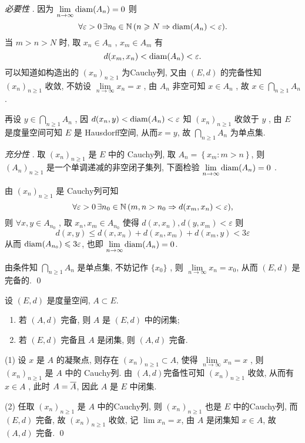     \begin{Proof}
       \textsl{必要性} . 因为 $ \lim\limits_{n\to\infty}\diam(A_{n})=0 $ 则
       \[
          \forall \varepsilon>0\,\exists n_{0}\in\N\,(n\geqslant N\Rightarrow \diam(A_{n})<\varepsilon).
       \]
       当 $ m>n>N $ 时, 取 $ x_{n}\in A_{n} $ , $ x_{m}\in A_{m} $ 有
       \[
          d(x_{m}, x_{n})<\diam(A_{n})<\varepsilon.
       \]
       可以知道如构造出的 $ (x_{n})_{n\geqslant1} $ 为Cauchy列, 又由 $ (E, d) $ 的完备性知 $ (x_{n})_{n\geqslant1} $ 收敛, 不妨设 $\lim\limits_{n\to\infty}x_{n}=x$ , 由 $ A_{n} $ 非空可知 $ x\in A_{n} $ , 故 $ x\in\bigcap\limits_{n\geqslant1}A_{n} $ .

       再设 $ y\in\bigcap\limits_{n\geqslant1} A_{n} $ , 因 $ d(x_{n}, y)<\diam(A_{n})<\varepsilon $ 知 $ (x_{n})_{n\geqslant1} $ 收敛于 $ y $ , 由 $ E $ 是度量空间可知 $ E $ 是 Hausdorff空间, 从而$ x=y $, 故 $ \bigcap\limits_{n\geqslant1} A_{n} $ 为单点集.

       \textsl{充分性} . 取 $ (x_{n})_{n\geqslant1} $ 是 $ E $ 中的 Cauchy列, 取 $ A_{n}=\left\{ x_{m}:m>n \right\} $, 则 $ (A_{n})_{n\geqslant1} $ 是一个单调递减的非空闭子集列, 下面检验 $ \lim\limits_{n\to\infty}\diam(A_{n})=0 $ .

       由 $ (x_{n})_{n\geqslant1} $ 是 Cauchy列可知
       \[
          \forall \varepsilon>0\, \exists n_{0}\in\N\,(m, n>n_{0}\Rightarrow d(x_{m}, x_{n})<\varepsilon),
       \]
       则 $ \forall x, y\in A_{n_{0}} $ , 取 $ x_{n}, x_{m}\in A_{n_{0}} $ 使得 $ d(x, x_{n}), d(y, x_{m})<\varepsilon $ 则
       \[
          d(x, y)\leqslant d(x, x_{n})+d(x_{n}, x_{m})+d(x_{m}, y) < 3\varepsilon
       \]
       从而 $ \diam(A_{n_{0}})\leqslant3\varepsilon $, 也即 $\lim\limits_{n\to\infty} \diam(A_{n})=0 $.

       由条件知 $ \bigcap\limits_{n\geqslant1}A_{n} $ 是单点集, 不妨记作 $ \{ x_{0} \} $ , 则 $ \lim\limits_{n\to\infty}x_{n}=x_{0} $, 从而 $ (E, d) $  是完备的. \qed
    \end{Proof}
    \begin{Theorem}
       设 $ (E, d) $ 是度量空间, $ A\subset E $.
       \begin{enumerate}[(1)]
          \item 若 $ (A, d) $ 完备, 则 $ A $ 是 $ (E, d) $ 中的闭集;
          \item 若 $ (E, d) $ 完备且 $ A $ 是闭集, 则 $ (A, d) $ 完备.
       \end{enumerate}
    \end{Theorem}
    \begin{Proof}
       (1) 设 $ x $ 是 $ A $ 的凝聚点, 则存在 $ (x_{n})_{n\geqslant1}\subset A $, 使得 $ \lim\limits_{n\to\infty}x_{n}=x $ , 则 $ (x_{n})_{n\geqslant1} $ 是 $ A $ 中的 Cauchy列. 由 $ (A, d) $完备性可知 $ (x_{n})_{n\geqslant1} $ 收敛, 从而有 $ x\in A $ , 此时 $ A=\baro{A} $, 因此 $ A $ 是 $ E $ 中闭集.

       (2) 任取 $ (x_{n})_{n\geqslant1} $ 是 $ A $ 中的Cauchy列, 则 $ (x_{n})_{n\geqslant1} $ 也是 $ E $ 中的Cauchy列, 而 $ (E, d) $ 完备, 故 $ (x_{n})_{n\geqslant1} $ 收敛, 记 $ \lim\limits x_{n}=x $, 由 $ A $ 是闭集知 $ x\in A $, 故 $ (A, d) $ 完备. \qed
    \end{Proof}
